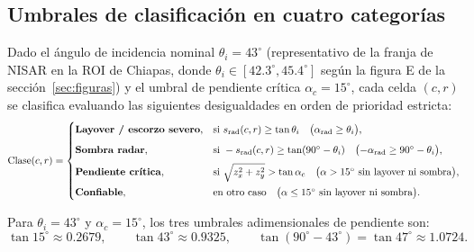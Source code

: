 \documentclass[11pt,a4paper]{article}
\begin{document}
\subsection{Umbrales de clasificación en cuatro categorías}
\label{sec:relieve3d-clases-sar}

Dado el ángulo de incidencia nominal $\theta_i = 43^\circ$ (representativo de la franja de NISAR en la ROI de
Chiapas, donde $\theta_i\in[42.3^\circ,45.4^\circ]$ según la figura E de la sección~\ref{sec:figuras}) y el
umbral de pendiente crítica $\alpha_c = 15^\circ$, cada celda $(c,r)$ se clasifica evaluando las siguientes
desigualdades en orden de prioridad estricta:
\begin{equation}
  \mathrm{Clase}(c,r) =
  \begin{cases}
    \text{\textbf{Layover / escorzo severo}}, &
      \text{si } s_{\mathrm{rad}}(c,r) \ge \tan\theta_i
      \quad\bigl(\alpha_{\mathrm{rad}} \ge \theta_i\bigr),\\[6pt]
    \text{\textbf{Sombra radar}}, &
      \text{si } -s_{\mathrm{rad}}(c,r) \ge \tan(90^\circ - \theta_i)
      \quad\bigl(-\alpha_{\mathrm{rad}} \ge 90^\circ - \theta_i\bigr),\\[6pt]
    \text{\textbf{Pendiente crítica}}, &
      \text{si } \sqrt{z_x^2 + z_y^2} > \tan\alpha_c
      \quad\bigl(\alpha > 15^\circ\text{ sin layover ni sombra}\bigr),\\[6pt]
    \text{\textbf{Confiable}}, &
      \text{en otro caso} \quad\bigl(\alpha \le 15^\circ\text{ sin layover ni sombra}\bigr).
  \end{cases}
  \label{eq:clasificacion-sar}
\end{equation}

Para $\theta_i = 43^\circ$ y $\alpha_c = 15^\circ$, los tres umbrales adimensionales de pendiente son:
\begin{equation}
  \tan 15^\circ \approx 0.2679,
  \qquad
  \tan 43^\circ \approx 0.9325,
  \qquad
  \tan(90^\circ - 43^\circ) = \tan 47^\circ \approx 1.0724.
\end{equation}
\end{document}
